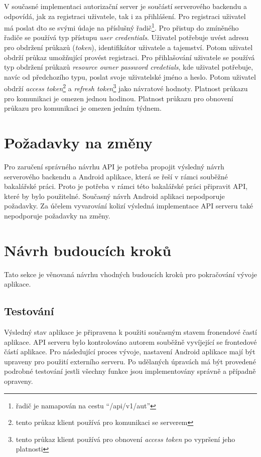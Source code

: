         V současné implementaci autorizační server je součástí serverového backendu a odpovídá, jak za registraci uživatele, tak i za přihlášení. Pro registraci uživatel má poslat dto se svými údaje na příslušný řadič\footnote{řadič je namapován na cestu \enquote{/api/v1/aut}}. Pro přistup do zmíněného řadiče se používá typ přístupu \textit{user credentials}. Uživatel potřebuje uvést adresu pro obdržení průkazů (\textit{token}), identifikátor uživatele a tajemství. Potom uživatel obdrží průkaz umožňující provést registraci.
        Pro přihlašování uživatele se používá typ obdržení průkazů \textit{resource owner password credetials}, kde uživatel potřebuje, navíc od předchozího typu, poslat svoje uživatelské jméno a heslo. Potom uživatel obdrží \textit{access token}\footnote{tento průkaz klient používá pro komunikaci se serverem} a \textit{refresh token}\footnote{tento průkaz klient používá pro obnovení \textit{access token} po vypršení jeho platnosti} jako návratové hodnoty. Platnost průkazu pro komunikaci je omezen jednou hodinou. Platnost průkazu pro obnovení průkazu pro komunikaci je omezen jedním týdnem.
        
    \section{Požadavky na změny}
        Pro zaručení správného návrhu API je potřeba propojit výsledný návrh serverového backendu a Android aplikace, která se řeší v rámci souběžné bakalářské práci. Proto je potřeba v rámci této bakalářské práci připravit API, které by bylo použitelné. Současný návrh Android aplikaci nepodporuje požadavky. Za účelem vyvarování kolizí výsledná implementace API serveru také nepodporuje požadavky na změny.

\section{Návrh budoucích kroků}
    Tato sekce je věnovaná návrhu vhodných budoucích kroků pro pokračování vývoje aplikace.
    
    \subsection{Testování}
        Výsledný stav aplikace je připravena k použiti současným stavem fronendové častí aplikace. API serveru bylo kontrolováno autorem souběžně vyvíjející se frontedové částí aplikace. Pro následující proces vývoje, nastavení Android aplikace mají být upraveny pro použití externího serveru. Po udělaných úpravách má být provedené podrobné testování jestli všechny funkce jsou implementovány správně a případně opraveny.
    
